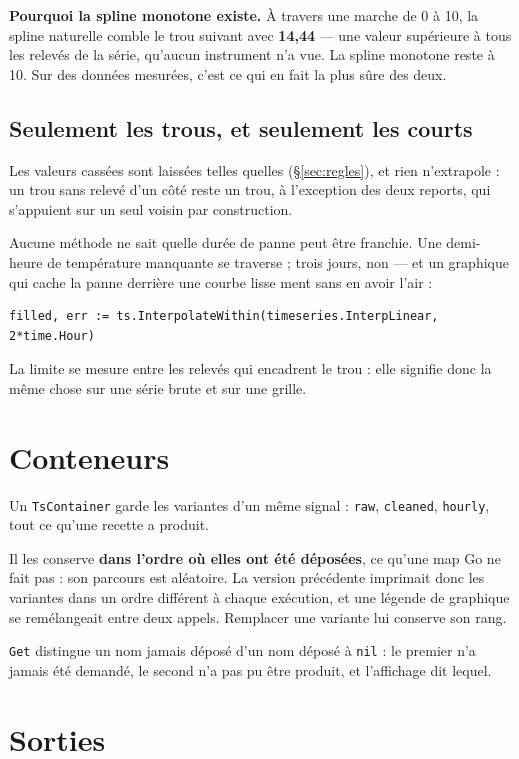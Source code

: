 \documentclass[11pt,a4paper]{report}
\begin{document}
\textbf{Pourquoi la spline monotone existe.} À travers une marche de 0 à
10, la spline naturelle comble le trou suivant avec \textbf{14,44} ---
une valeur supérieure à tous les relevés de la série, qu'aucun
instrument n'a vue. La spline monotone reste à 10. Sur des données
mesurées, c'est ce qui en fait la plus sûre des deux.

\section{Seulement les trous, et seulement les courts}

Les valeurs cassées sont laissées telles quelles (\S\ref{sec:regles}), et rien
n'extrapole : un trou sans relevé d'un côté reste un trou, à l'exception
des deux reports, qui s'appuient sur un seul voisin par construction.

Aucune méthode ne sait quelle durée de panne peut être franchie. Une
demi-heure de température manquante se traverse ; trois jours, non ---
et un graphique qui cache la panne derrière une courbe lisse ment sans
en avoir l'air :

\begin{verbatim}
filled, err := ts.InterpolateWithin(timeseries.InterpLinear, 2*time.Hour)
\end{verbatim}

La limite se mesure entre les relevés qui encadrent le trou : elle
signifie donc la même chose sur une série brute et sur une grille.

\chapter{Conteneurs}\label{chap:conteneurs}

Un \texttt{TsContainer} garde les variantes d'un même signal :
\texttt{raw}, \texttt{cleaned}, \texttt{hourly}, tout ce qu'une recette
a produit.

Il les conserve \textbf{dans l'ordre où elles ont été déposées}, ce
qu'une map Go ne fait pas : son parcours est aléatoire. La version
précédente imprimait donc les variantes dans un ordre différent à chaque
exécution, et une légende de graphique se remélangeait entre deux
appels. Remplacer une variante lui conserve son rang.

\texttt{Get} distingue un nom jamais déposé d'un nom déposé à
\texttt{nil} : le premier n'a jamais été demandé, le second n'a pas pu
être produit, et l'affichage dit lequel.

\chapter{Sorties}\label{chap:sorties}
\end{document}
